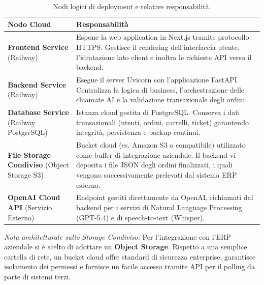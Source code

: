 \documentclass[a4paper, 11pt, oneside]{scrartcl}
\begin{document}
\begin{table}[H]
    \centering
    \renewcommand{\arraystretch}{1.5}
    \begin{tabularx}{\textwidth}{@{}lX@{}}
        \toprule
        \textbf{Nodo Cloud} & \textbf{Responsabilità} \\
        \midrule
        \textbf{Frontend Service} \newline (Railway) & Espone la web application in Next.js tramite protocollo HTTPS. Gestisce il rendering dell'interfaccia utente, l'idratazione lato client e inoltra le richieste API verso il backend. \\
        \textbf{Backend Service} \newline (Railway) & Esegue il server Uvicorn con l'applicazione FastAPI. Centralizza la logica di business, l'orchestrazione delle chiamate AI e la validazione transazionale degli ordini. \\
        \textbf{Database Service} \newline (Railway PostgreSQL) & Istanza cloud gestita di PostgreSQL. Conserva i dati transazionali (utenti, ordini, carrelli, ticket) garantendo integrità, persistenza e backup continui. \\
        \textbf{File Storage Condiviso} \newline (Object Storage S3) & Bucket cloud (es. Amazon S3 o compatibile) utilizzato come buffer di integrazione aziendale. Il backend vi deposita i file JSON degli ordini finalizzati, i quali vengono successivamente prelevati dal sistema ERP esterno. \\
        \textbf{OpenAI Cloud API} \newline (Servizio Esterno) & Endpoint gestiti direttamente da OpenAI, richiamati dal backend per i servizi di Natural Language Processing (GPT-5.4) e di speech-to-text (Whisper). \\
        \bottomrule
    \end{tabularx}
    \caption{Nodi logici di deployment e relative responsabilità.}
\end{table}

\textit{Nota architetturale sullo Storage Condiviso:} Per l'integrazione con l'ERP aziendale si è scelto di adottare un \textbf{Object Storage}. Rispetto a una semplice cartella di rete, un bucket cloud offre standard di sicurezza enterprise, garantisce isolamento dei permessi e fornisce un facile accesso tramite API per il polling da parte di sistemi terzi.
\end{document}

